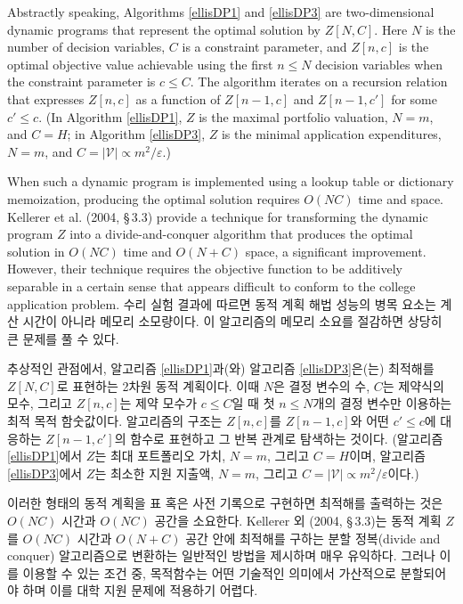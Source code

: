 \documentclass[11pt]{article} %
\theoremstyle{definition}
\theoremstyle{definition}
\begin{document}
Abstractly speaking, Algorithms \ref{ellisDP1} and \ref{ellisDP3} are two-dimensional dynamic programs that represent the optimal solution by $Z[N, C]$. Here $N$ is the number of decision variables, $C$ is a constraint parameter, and $Z[n, c]$ is the optimal objective value achievable using the first $n\leq N$ decision variables when the constraint parameter is $c \leq C$. The algorithm iterates on a recursion relation that expresses $Z[n, c]$ as a function of $Z[n -1, c]$ and $Z[n -1, c']$ for some $c' \leq c$. (In Algorithm \ref{ellisDP1}, $Z$ is the maximal portfolio valuation, $N = m$, and $C =H$; in Algorithm \ref{ellisDP3},  $Z$ is the minimal application expenditures, $N = m$, and $C = |\mathcal{V}| \propto m^2 / \varepsilon$.)

When such a dynamic program is implemented using a lookup table or dictionary memoization, producing the optimal solution requires $O(NC)$ time and space. Kellerer et al. (2004, \S\,3.3) provide a technique for transforming the dynamic program $Z$ into a divide-and-conquer algorithm that produces the optimal solution in $O(N C)$ time and $O(N + C)$ space, a significant improvement. However, their technique requires the objective function to be additively separable in a certain sense that appears difficult to conform to the college application problem. 
\else
수리 실험 결과에 따르면 동적 계획 해법 성능의 병목 요소는 계산 시간이 아니라 메모리 소모량이다. 이 알고리즘의 메모리 소요를 절감하면 상당히 큰 문제를 풀 수 있다.

추상적인 관점에서, 알고리즘 \ref{ellisDP1}과(와) 알고리즘 \ref{ellisDP3}은(는) 최적해를 $Z[N, C]$로 표현하는 2차원 동적 계획이다. 이때 $N$은 결정 변수의 수, $C$는 제약식의 모수, 그리고 $Z[n, c]$는 제약 모수가 $c \leq C$일 때 첫 $n\leq N$개의 결정 변수만 이용하는 최적 목적 함숫값이다. 알고리즘의 구조는 $Z[n, c]$를 $Z[n -1, c]$와 어떤 $c' \leq c$에 대응하는 $Z[n -1, c']$의 함수로 표현하고 그 반복 관계로 탐색하는 것이다. (알고리즘 \ref{ellisDP1}에서 $Z$는 최대 포트폴리오 가치, $N = m$, 그리고 $C =H$이며, 알고리즘 \ref{ellisDP3}에서 $Z$는 최소한 지원 지출액, $N = m$, 그리고 $C= |\mathcal{V}| \propto m^2 / \varepsilon$이다.)

이러한 형태의 동적 계획을 표 혹은 사전 기록으로 구현하면 최적해를 출력하는 것은 $O(NC)$ 시간과 $O(NC)$ 공간을 소요한다. Kellerer 외 (2004, \S\,3.3)는 동적 계획 $Z$를 $O(N C)$ 시간과 $O(N + C)$ 공간 안에 최적해를 구하는 분할 정복(divide and conquer) 알고리즘으로 변환하는 일반적인 방법을 제시하며 매우 유익하다. 그러나 이를 이용할 수 있는 조건 중, 목적함수는 어떤 기술적인 의미에서 가산적으로 분할되어야 하며 이를 대학 지원 문제에 적용하기 어렵다.
\fi
\end{document}
